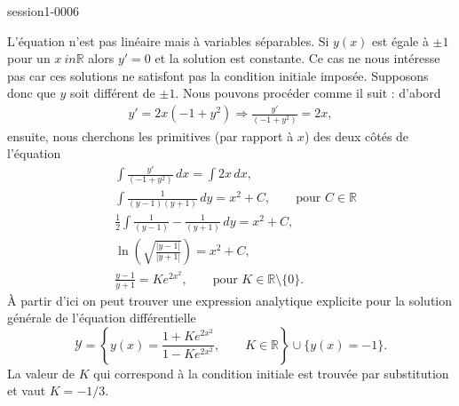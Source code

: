 
\begin{corrige}{session1-0006}

L'équation n'est pas linéaire mais \`a variables séparables. Si $y(x)$ est égale \`a $\pm 1$ pour un $x\ in \mathbb{R}$ alors $y' = 0$ et la solution est constante. Ce cas ne nous intéresse pas car ces solutions ne satisfont pas la condition initiale imposée. Supposons donc  que $y$ soit différent de $\pm 1$. Nous pouvons  procéder comme il suit : d'abord  
\begin{align*}
  y'=2x(-1+y^2) \Rightarrow \frac{y'}{(-1+y^2)}  = 2x,
\end{align*}
ensuite, nous cherchons les primitives (par rapport \`a $x$) des deux côtés de l'équation
\begin{align*}
  &\int \frac{y'}{(-1+y^2)}\, dx = \int 2x \, dx , \\
  &\int \frac{1}{(y-1)(y+1)}\, dy = x^2 +C,  \qquad \text{pour } C\in\mathbb{R} \\
  &\frac{1}{2}\int \frac{1}{(y-1)}-\frac{1}{(y+1)}\, dy = x^2 +C, \\
 &\ln\left(\sqrt{\frac{|y-1|}{|y+1|}}\right) = x^2 +C ,\\
&\frac{y-1}{y+1} = Ke^{2x^2}, \qquad \text{pour } K \in\mathbb{R}\setminus\{0\} . 
\end{align*}
\`A partir d'ici on peut trouver une expression analytique explicite pour la solution générale de l'équation différentielle   
\begin{equation*}
 \mathcal{Y} = \left\{ y(x) = \frac{1+Ke^{2x^2}}{1-Ke^{2x^2}}, \qquad  K\in\mathbb{R}\right\}\cup\{y(x)=-1\}.
\end{equation*}
La valeur de $K$ qui correspond \`a la condition initiale est trouvée par substitution et vaut $K= -1/3$.


\end{corrige}
